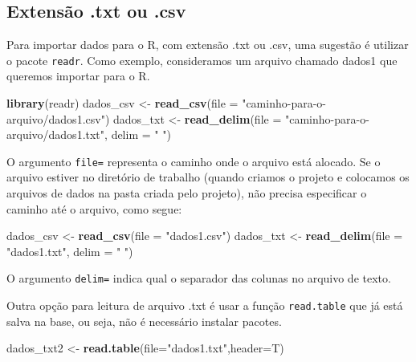 \documentclass[
]{book}
\newenvironment{Shaded}{\begin{snugshade}}{\end{snugshade}}
\newcommand{\DataTypeTok}[1]{\textcolor[rgb]{0.13,0.29,0.53}{#1}}
\newcommand{\KeywordTok}[1]{\textcolor[rgb]{0.13,0.29,0.53}{\textbf{#1}}}
\newcommand{\NormalTok}[1]{#1}
\newcommand{\StringTok}[1]{\textcolor[rgb]{0.31,0.60,0.02}{#1}}
\begin{document}
\hypertarget{extensuxe3o-.txt-ou-.csv}{%
\subsection{Extensão .txt ou .csv}\label{extensuxe3o-.txt-ou-.csv}}

Para importar dados para o R, com extensão .txt ou .csv, uma sugestão é utilizar o pacote \texttt{readr}. Como exemplo, consideramos um arquivo chamado dados1 que queremos importar para o R.

\begin{Shaded}
\begin{Highlighting}[]
\KeywordTok{library}\NormalTok{(readr)}
\NormalTok{dados_csv <-}\StringTok{ }\KeywordTok{read_csv}\NormalTok{(}\DataTypeTok{file =} \StringTok{"caminho-para-o-arquivo/dados1.csv"}\NormalTok{)}
\NormalTok{dados_txt <-}\StringTok{ }\KeywordTok{read_delim}\NormalTok{(}\DataTypeTok{file =} \StringTok{"caminho-para-o-arquivo/dados1.txt"}\NormalTok{, }\DataTypeTok{delim =} \StringTok{" "}\NormalTok{)}
\end{Highlighting}
\end{Shaded}

O argumento \texttt{file=} representa o caminho onde o arquivo está alocado. Se o arquivo estiver no diretório de trabalho (quando criamos o projeto e colocamos os arquivos de dados na pasta criada pelo projeto), não precisa especificar o caminho até o arquivo, como segue:

\begin{Shaded}
\begin{Highlighting}[]
\NormalTok{dados_csv <-}\StringTok{ }\KeywordTok{read_csv}\NormalTok{(}\DataTypeTok{file =} \StringTok{"dados1.csv"}\NormalTok{)}
\NormalTok{dados_txt <-}\StringTok{ }\KeywordTok{read_delim}\NormalTok{(}\DataTypeTok{file =} \StringTok{"dados1.txt"}\NormalTok{, }\DataTypeTok{delim =} \StringTok{" "}\NormalTok{)}
\end{Highlighting}
\end{Shaded}

O argumento \texttt{delim=} indica qual o separador das colunas no arquivo de texto.

Outra opção para leitura de arquivo .txt é usar a função \texttt{read.table} que já está salva na base, ou seja, não é necessário instalar pacotes.

\begin{Shaded}
\begin{Highlighting}[]
\NormalTok{dados_txt2 <-}\StringTok{ }\KeywordTok{read.table}\NormalTok{(}\DataTypeTok{file=}\StringTok{"dados1.txt"}\NormalTok{,}\DataTypeTok{header=}\NormalTok{T)}
\end{Highlighting}
\end{Shaded}
\end{document}
